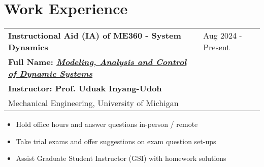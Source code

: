 \documentclass[letter,12pt]{article}
\begin{document}


\section{Work Experience}

\begin{tabularx}{\linewidth}{@{}l X@{}}
\large \textbf{Instructional Aid (IA) of ME360 - System Dynamics} & \hfill {Aug 2024 - Present} \\
\normalsize \textbf{Full Name: \href{https://me.engin.umich.edu/wp-content/uploads/2023/07/ME-360-Course-Profile.pdf}{\textit{Modeling, Analysis and Control of Dynamic Systems}}} & \hfill \small{} \\
\small \textbf{Instructor: Prof. Uduak Inyang-Udoh} & \hfill \small{} \\
\normalsize{Mechanical Engineering, University of Michigan} & \hfill \small{} \\
\end{tabularx}

\begin{itemize}[
    rightmargin=2cm
]
    \setlength{\itemsep}{1pt}
    \setlength{\parskip}{0pt}
    \setlength{\parsep}{0pt}
    \item{\small Hold office hours and answer questions in-person / remote}
    \item{\small Take trial exams and offer suggestions on exam question set-ups}
    \item{\small Assist Graduate Student Instructor (GSI) with homework solutions}

\end{itemize}
        
\end{document}
